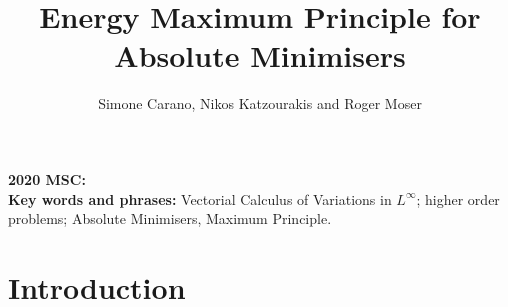 \documentclass[a4paper,11pt]{article}
\title{Energy Maximum Principle for Absolute Minimisers
}
\author{
Simone Carano, Nikos Katzourakis and Roger Moser}
\numberwithin{equation}{section}
\theoremstyle{definition}
\begin{document}
\maketitle

\begin{abstract} 

\end{abstract}
{\bf 2020 MSC:}\\
{\bf Key words and phrases:} Vectorial Calculus of Variations in $L^\infty$; higher order problems; Absolute Minimisers, Maximum Principle.

\section{Introduction}\label{sec:introduction}
\end{document}
